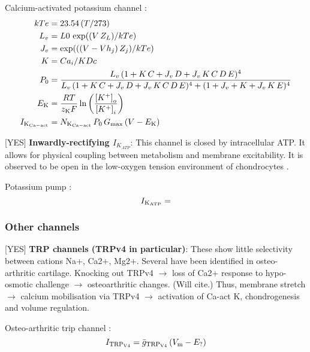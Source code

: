 Calcium-activated potassium channel \citep{HorriganAldrich2002}:
\begin{equation}
  \begin{split}
    kTe & = 23.54\, (T/273)\\
    L_v & = L0\, \exp((V\, Z_L)/kTe)\\
    J_v & = \exp(((V - Vh_j)\, Z_j)/kTe)\\
    K & = Ca_i/KDc\\
    P_0 & = \frac{L_v\, (1+K\, C+J_v\, D+J_v\, K\, C\, D\, E)^4}
    {L_v\, (1+K\, C+J_v\, D+J_v\, K\, C\, D\, E)^4 +
      (1+J_v+K+J_v\, K\, E)^4}\\
    E_{\rm K} & =  \frac{R T}{z_{\rm K} F}
    \ln\left(\frac{\left[K^{+}\right]_{o}}
      {\left[K^{+}\right]_{i}}\right)\\
    I_{\rm K_{Ca-act}} & = N_{\rm K_{Ca-act}}\, P_0\, G_{\rm max}\, (V -
    E_{\rm K})
  \end{split}
\end{equation}

[YES] {\bf Inwardly-rectifying $I_{K_{ATP}}$}: This channel is closed by
intracellular ATP. It allows for physical coupling between metabolism
and membrane excitability. It is observed to be open in the low-oxygen
tension environment of chondrocytes \citep{DartStanden1994,
  Mobasherietal2007}.

Potassium pump \citep{UNKNOWN}:
\begin{equation}
  I_{\rm K_{ATP}} =
\end{equation}

\subsubsection*{Other channels}
\label{sec:other-channels}

[YES] {\bf TRP channels (TRPv4 in particular)}: These show little
selectivity between cations Na+, Ca2+, Mg2+. Several have been
identified in osteo-arthritic cartilage. Knocking out TRPv4
$\rightarrow$ loss of Ca2+ response to hypo-osmotic challenge
$\rightarrow$ osteoarthritic changes. (Will cite.) Thus, membrane
stretch $\rightarrow$ calcium mobilisation via TRPv4 $\rightarrow$
activation of Ca-act K, chondrogenesis and volume regulation.

Osteo-arthritic trip channel \citep{UNKNOWN}:
\begin{equation}
  I_{\rm TRP_{V4}} = \bar{g}_{\rm TRP_{V4}}\, (V_{\rm m} - E_{\rm ?})
\end{equation}

